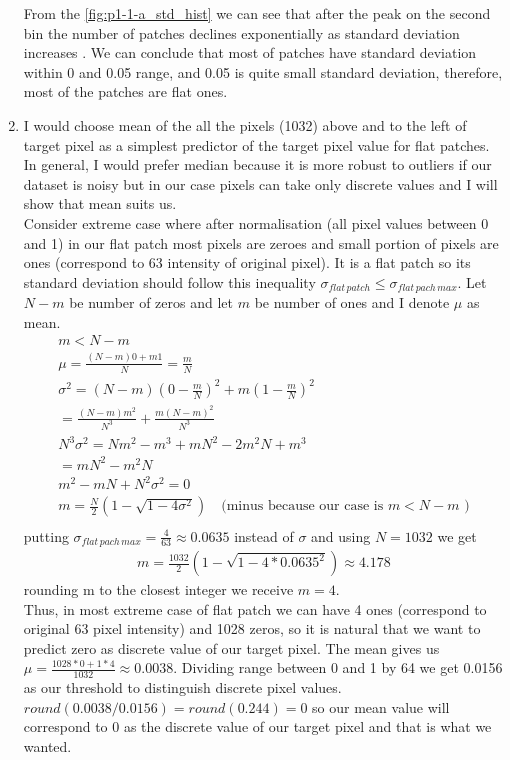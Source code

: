 \documentclass{article}
\begin{document}
\begin{enumerate}[label=(\alph*)]
				 	From the \ref{fig:p1-1-a_std_hist} we can see that after the peak on the second bin the number of patches declines exponentially as  standard deviation increases . We can conclude that most of patches have standard deviation within 0 and 0.05 range, and 0.05 is quite small standard deviation, therefore, most of the patches are flat ones. 
				\item
					I would choose mean of the all the pixels (1032) above and to the left of target pixel as a simplest predictor of the target pixel value for flat patches. In general, I would prefer median because it is more robust to outliers if our dataset is noisy but in our case pixels can take only discrete values and I will show that mean suits us.\\
					Consider extreme case where after normalisation (all pixel values between 0 and 1) in our flat patch  most pixels are zeroes and small portion of pixels are ones (correspond to 63 intensity of original pixel). It is a flat patch so its standard deviation should follow this inequality $\sigma_{flat \, patch} \leq \sigma_{flat \, pach \, max}$. Let $N-m$ be number of zeros and let $m$ be number of ones and I denote $\mu$ as mean. 
					\begin{gather*}
						m < N - m\\
						\mu = \frac{(N - m) 0 + m  1}{N} = \frac{m}{N}\\
						\sigma^2 = (N - m) (0 - \frac{m}{N})^2 + m(1 - \frac{m}{N})^2 \\
						= \frac{(N - m)m^2}{N^3} + \frac{m(N - m)^2}{N ^ 3}\\
						N^3\sigma^2 = Nm^2 - m^3 + mN^2 - 2m^2N + m^3 \\
						= mN^2-m^2N\\
						m^2 - mN + N^2\sigma^2 = 0\\
						m = \frac{N}{2}(1 - \sqrt{1 - 4 \sigma ^ 2})\quad\text{(minus because our case is $m < N - m$ )}\\
					\end{gather*}
					putting $\sigma_{flat \, pach \, max} = \frac{4}{63} \approx 0.0635$ instead of $\sigma$ and using $N = 1032$ we get
					\begin{gather*}
						m = \frac{1032}{2}(1 - \sqrt{1 - 4 * 0.0635^2}) \approx 4.178
					\end{gather*}
					rounding m to the closest integer we receive $m = 4$. \\Thus, in most extreme case of flat patch we can have 4 ones (correspond to original 63 pixel intensity) and 1028 zeros, so it is natural that we want to predict zero as discrete value of our target pixel.  The mean gives us $\mu = \frac{1028 * 0 + 1 * 4} {1032} \approx 0.0038$. Dividing range between 0 and 1 by 64 we get 0.0156 as our threshold to distinguish discrete pixel values. $round(0.0038/0.0156)=round(0.244)=0$ so our mean value will correspond to 0 as the discrete value of our target pixel and that is what we wanted.

			\end{enumerate}		
\end{document}
